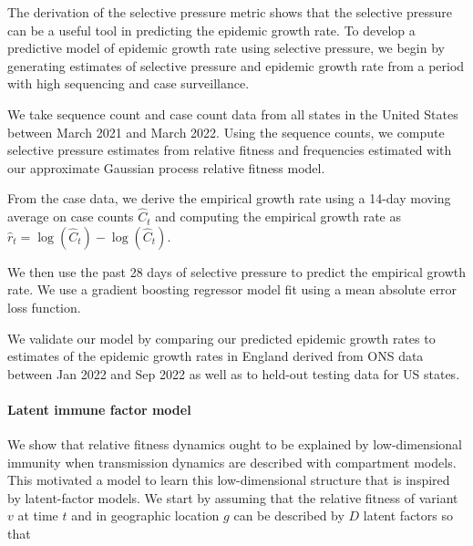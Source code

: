 \documentclass[11pt,oneside,letterpaper]{article}
\begin{document}
The derivation of the selective pressure metric shows that the selective pressure can be a useful tool in predicting the epidemic growth rate.
To develop a predictive model of epidemic growth rate using selective pressure, we begin by generating estimates of selective pressure and epidemic growth rate from a period with high sequencing and case surveillance.

We take sequence count and case count data from all states in the United States between March 2021 and March 2022.
Using the sequence counts, we compute selective pressure estimates from relative fitness and frequencies estimated with our approximate Gaussian process relative fitness model.

From the case data, we derive the empirical growth rate using a 14-day moving average on case counts $\hat{C}_{t}$ and computing the empirical growth rate as $\hat{r}_{t} = \log(\hat{C}_{t}) - \log(\hat{C}_{t})$.

We then use the past 28 days of selective pressure to predict the empirical growth rate.
We use a gradient boosting regressor model fit using a mean absolute error loss function.

We validate our model by comparing our predicted epidemic growth rates to estimates of the epidemic growth rates in England derived from ONS data between Jan 2022 and Sep 2022 as well as to held-out testing data for US states.


\paragraph{Latent immune factor model}%

We show that relative fitness dynamics ought to be explained by low-dimensional immunity when transmission dynamics are described with compartment models.
This motivated a model to learn this low-dimensional structure that is inspired by latent-factor models.
We start by assuming that the relative fitness of variant $v$ at time $t$ and in geographic location $g$ can be described by $D$ latent factors so that
\end{document}
